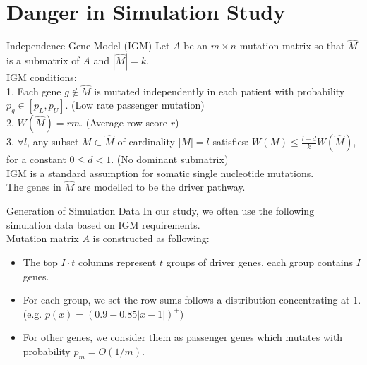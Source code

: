 \documentclass[xcolor=dvipsnames]{beamer}
\begin{document}
\section{Danger in Simulation Study}
\begin{frame}{Independence Gene Model (IGM)}
Let $A$ be an $m\times n$ mutation matrix so that $\hat{M}$ is a submatrix of $A$ and $|\hat{M}|=k$.\\
IGM conditions:\\
1. Each gene $g\notin \hat{M}$ is mutated independently in each patient with probability $p_g\in[p_L,p_U]$. (Low rate passenger mutation)\\
2. $W(\hat{M})=rm$. (Average row score $r$)\\
3. $\forall l$, any subset $M\subset \hat{M}$ of cardinality $|M|=l$ satisfies: $W(M)\leqslant \frac{l+d}{k}W(\hat{M})$, for a constant $0\leqslant d<1$. (No dominant submatrix)\\
IGM is a standard assumption for somatic single nucleotide mutations.\\
The genes in $\hat{M}$ are modelled to be the driver pathway.\\
\end{frame}
\begin{frame}{Generation of Simulation Data}
In our study, we often use the following simulation data based on IGM requirements.\\
Mutation matrix $A$ is constructed as following:\\
\begin{itemize}
\item The top $I\cdot t$ columns represent $t$ groups of driver genes, each group contains $I$ genes.\\
\item For each group, we set the row sums follows a distribution concentrating at 1. (e.g. $p(x)=(0.9-0.85|x-1|)^+$)\\
\item For other genes, we consider them as passenger genes which mutates with probability $p_m=O(1/m)$.\\
\end{itemize}
\end{frame}
\end{document}
